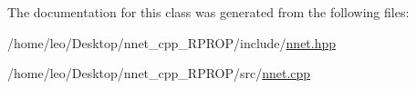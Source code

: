 The documentation for this class was generated from the following files\+:\begin{DoxyCompactItemize}
\item 
/home/leo/\+Desktop/nnet\+\_\+cpp\+\_\+\+R\+P\+R\+O\+P/include/\hyperlink{nnet_8hpp}{nnet.\+hpp}\item 
/home/leo/\+Desktop/nnet\+\_\+cpp\+\_\+\+R\+P\+R\+O\+P/src/\hyperlink{nnet_8cpp}{nnet.\+cpp}\end{DoxyCompactItemize}
